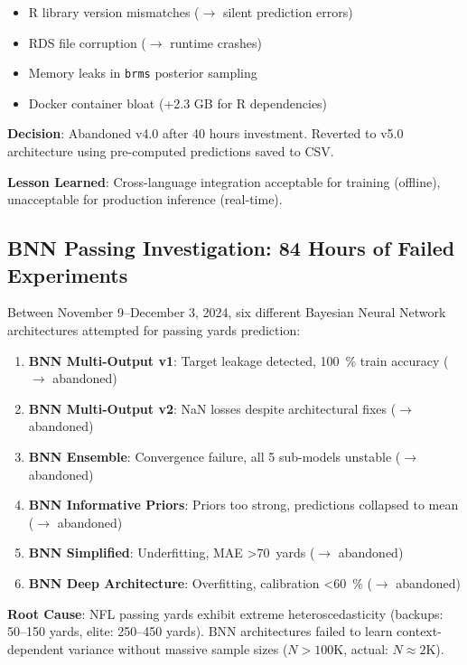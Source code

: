 \begin{itemize}
\item R library version mismatches ($\rightarrow$ silent prediction errors)
\item RDS file corruption ($\rightarrow$ runtime crashes)
\item Memory leaks in \texttt{brms} posterior sampling
\item Docker container bloat (+2.3 GB for R dependencies)
\end{itemize}

\textbf{Decision}: Abandoned v4.0 after 40 hours investment. Reverted to v5.0 architecture using pre-computed predictions saved to CSV.

\textbf{Lesson Learned}: Cross-language integration acceptable for training (offline), unacceptable for production inference (real-time).

\subsection{BNN Passing Investigation: 84 Hours of Failed Experiments}

Between November 9--December 3, 2024, six different Bayesian Neural Network architectures attempted for passing yards prediction:

\begin{enumerate}
\item \textbf{BNN Multi-Output v1}: Target leakage detected, \SI{100}{\percent} train accuracy ($\rightarrow$ abandoned)
\item \textbf{BNN Multi-Output v2}: NaN losses despite architectural fixes ($\rightarrow$ abandoned)
\item \textbf{BNN Ensemble}: Convergence failure, all 5 sub-models unstable ($\rightarrow$ abandoned)
\item \textbf{BNN Informative Priors}: Priors too strong, predictions collapsed to mean ($\rightarrow$ abandoned)
\item \textbf{BNN Simplified}: Underfitting, MAE \SI{>70}{yards} ($\rightarrow$ abandoned)
\item \textbf{BNN Deep Architecture}: Overfitting, calibration \SI{<60}{\percent} ($\rightarrow$ abandoned)
\end{enumerate}

\textbf{Root Cause}: NFL passing yards exhibit extreme heteroscedasticity (backups: 50--150 yards, elite: 250--450 yards). BNN architectures failed to learn context-dependent variance without massive sample sizes ($N > 100\text{K}$, actual: $N \approx 2\text{K}$).

